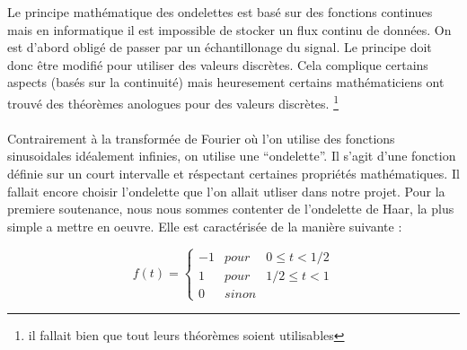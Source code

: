 \documentclass[a4paper,12pt]{article}
\begin{document}
Le principe mathématique des ondelettes est basé sur des fonctions continues
mais en informatique il est impossible de stocker un flux continu de données. On
est d'abord obligé de passer par un échantillonage du signal. Le principe doit
donc \^etre modifié pour utiliser des valeurs discr\`etes. Cela complique certains
aspects (basés sur la continuité) mais heuresement certains mathématiciens ont
trouvé des théorèmes anologues pour des valeurs discrètes. \footnote{il fallait bien que
tout leurs théorèmes soient utilisables}\\\\
Contrairement à la transformée de Fourier où l'on utilise des fonctions
sinusoidales idéalement infinies, on utilise une ``ondelette''. Il s'agit d'une
fonction définie sur un court intervalle et réspectant certaines propriétés
mathématiques. Il fallait encore choisir l'ondelette que l'on allait utliser dans
notre projet. Pour la premiere soutenance, nous nous sommes contenter de
l'ondelette de Haar, la plus simple a mettre en oeuvre. Elle est caractérisée de
la manière suivante :

$$ f(t) = \left\{\begin{array}{rcl} -1 & pour & 0 \leq t < 1/2 \\ 1 & pour & 1/2 \leq t < 1 \\ 0 & sinon & \end{array} \right.$$
\end{document}
